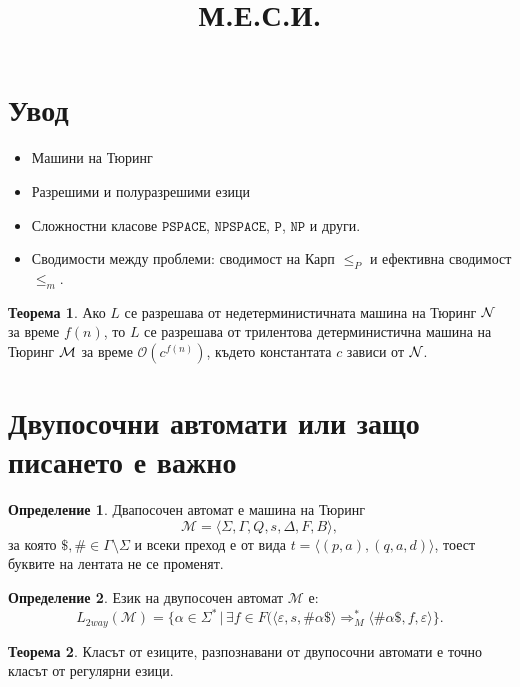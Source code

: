 \documentclass[a4paper]{article}
\title{М.Е.С.И.}
\theoremstyle{definition}
\newtheorem{theorem}{Теорема}
\newtheorem{definition}{Определение}
\begin{document}
\maketitle

\section{Увод}

\begin{itemize}
\item
  Машини на Тюринг
\item
  Разрешими и полуразрешими езици
\item
  Сложностни класове $\texttt{PSPACE}$, $\texttt{NPSPACE}$, $\texttt{P}$, $\texttt{NP}$ и други.
\item
  Сводимости между проблеми: сводимост на Карп $\leq_P$ и ефективна сводимост $\leq_m$.
\end{itemize}

\begin{theorem}
  Ако $L$ се разрешава от недетерминистичната машина на Тюринг $\mathcal{N}$ за време $f(n)$, то
  $L$ се разрешава от трилентова детерминистична машина на Тюринг $\mathcal{M}$ за време $\mathcal{O}(c^{f(n)})$, където константата $c$ зависи от $\mathcal{N}$.
\end{theorem}

\section{Двупосочни автомати или защо писането е важно}
\begin{definition}
  Двапосочен автомат е машина на Тюринг
  \[\mathcal{M}=\langle \Sigma,\Gamma,Q,s,\Delta,F,B\rangle,\]
  за която
  $\$,\#\in \Gamma\setminus\Sigma$ и  всеки преход е от вида $t=\langle (p,a),(q,a,d)\rangle$, тоест буквите на лентата не се променят.
\end{definition}
\begin{definition}
  Език на двупосочен автомат $\mathcal{M}$ е:
  \begin{equation*}
    L_{2way}(\mathcal{M})=\{\alpha \in \Sigma^*\,|\,\exists f\in F( \langle \varepsilon,s,\#\alpha\$\rangle \Rightarrow_M^* \langle \#\alpha\$,f,\varepsilon\rangle\}.
  \end{equation*}
\end{definition}
\begin{theorem}
  Класът от езиците, разпознавани от двупосочни автомати е точно класът от регулярни езици.
\end{theorem}
\end{document}
